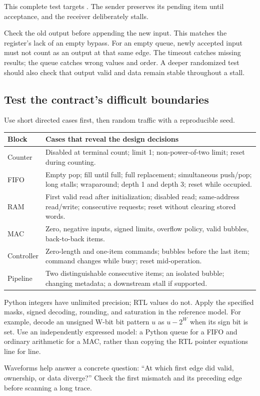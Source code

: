 \documentclass[11pt]{article}
\newcommand{\cd}[1]{{\frenchspacing\texttt{\detokenize{#1}}}}
\newcommand{\pyfile}[1]{\par\noindent\begin{minipage}{\linewidth}\end{minipage}\par}
\begin{document}
This complete test targets \cd{rv_register.sv}. The sender preserves its pending item until acceptance, and the receiver deliberately stalls.
\pyfile{examples/test_elastic.py}
Check the old output before appending the new input. This matches the register's lack of an empty bypass.
For an empty queue, newly accepted input must not count as an output at that same edge.
The timeout catches missing results; the queue catches wrong values and order.
A deeper randomized test should also check that output valid and data remain stable throughout a stall.

\subsection{Test the contract's difficult boundaries}
Use short directed cases first, then random traffic with a reproducible seed.
\begin{longtable}{@{}L{3.4cm}L{12.6cm}@{}}
\toprule Block & Cases that reveal the design decisions \\ \midrule\endhead
Counter & Disabled at terminal count; limit 1; non-power-of-two limit; reset during counting.\\
FIFO & Empty pop; fill until full; full replacement; simultaneous push/pop; long stalls; wraparound; depth 1 and depth 3; reset while occupied.\\
RAM & First valid read after initialization; disabled read; same-address read/write; consecutive requests; reset without clearing stored words.\\
MAC & Zero, negative inputs, signed limits, overflow policy, valid bubbles, back-to-back items.\\
Controller & Zero-length and one-item commands; bubbles before the last item; command changes while busy; reset mid-operation.\\
Pipeline & Two distinguishable consecutive items; an isolated bubble; changing metadata; a downstream stall if supported.\\
\bottomrule
\end{longtable}
Python integers have unlimited precision; RTL values do not. Apply the specified masks, signed decoding, rounding, and saturation in the reference model.
For example, decode an unsigned W-bit bit pattern \(u\) as \(u-2^W\) when its sign bit is set.
Use an independently expressed model: a Python queue for a FIFO and ordinary arithmetic for a MAC, rather than copying the RTL pointer equations line for line.

Waveforms help answer a concrete question: ``At which first edge did valid, ownership, or data diverge?''
Check the first mismatch and its preceding edge before scanning a long trace.
\end{document}
